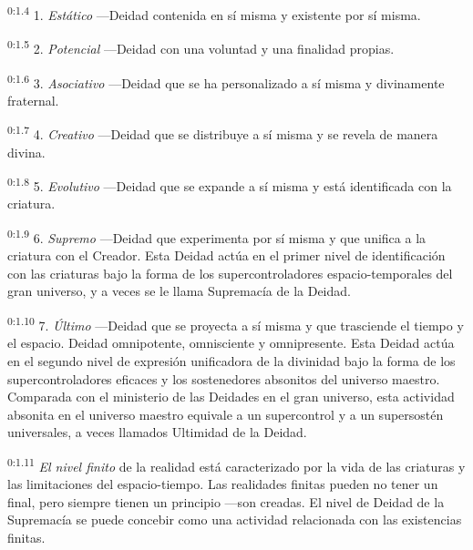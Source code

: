 \par
\textsuperscript{0:1.4} 1. \textit{Estático} ---Deidad contenida en sí misma y existente por sí misma.

\par
\textsuperscript{0:1.5} 2. \textit{Potencial} ---Deidad con una voluntad y una finalidad propias.

\par
\textsuperscript{0:1.6} 3. \textit{Asociativo} ---Deidad que se ha personalizado a sí misma y divinamente fraternal.

\par
\textsuperscript{0:1.7} 4. \textit{Creativo} ---Deidad que se distribuye a sí misma y se revela de manera divina.

\par
\textsuperscript{0:1.8} 5. \textit{Evolutivo} ---Deidad que se expande a sí misma y está identificada con la criatura.

\par
\textsuperscript{0:1.9} 6. \textit{Supremo} ---Deidad que experimenta por sí misma y que unifica a la criatura con el Creador. Esta Deidad actúa en el primer nivel de identificación con las criaturas bajo la forma de los supercontroladores espacio-temporales del gran universo, y a veces se le llama Supremacía de la Deidad.

\par
\textsuperscript{0:1.10} 7. \textit{Último} ---Deidad que se proyecta a sí misma y que trasciende el tiempo y el espacio. Deidad omnipotente, omnisciente y omnipresente. Esta Deidad actúa en el segundo nivel de expresión unificadora de la divinidad bajo la forma de los supercontroladores eficaces y los sostenedores absonitos del universo maestro. Comparada con el ministerio de las Deidades en el gran universo, esta actividad absonita en el universo maestro equivale a un supercontrol y a un supersostén universales, a veces llamados Ultimidad de la Deidad.

\par
\textsuperscript{0:1.11} \textit{El nivel finito} de la realidad está caracterizado por la vida de las criaturas y las limitaciones del espacio-tiempo. Las realidades finitas pueden no tener un final, pero siempre tienen un principio ---son creadas. El nivel de Deidad de la Supremacía se puede concebir como una actividad relacionada con las existencias finitas.

